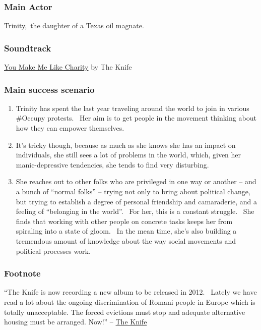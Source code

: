 \subsubsection{Main Actor}

Trinity,~the daughter of a Texas oil magnate.

\subsubsection{Soundtrack}

\href{http://www.youtube.com/watch?v=NWsX9ggfL2Q}{You Make Me Like
Charity} by The Knife

\subsubsection{Main success scenario}

\begin{enumerate}
\item
  Trinity has spent the last year traveling around the world to join in
  various \#Occupy protests. ~Her aim is to get people in the movement
  thinking about how they can empower themselves.
\item
  It's tricky though, because as much as she knows she has an impact on
  individuals, she still sees a lot of problems in the world, which,
  given her manic-depressive tendencies, she tends to find very
  disturbing.
\item
  She reaches out to other folks who are privileged in one way or
  another -- and a bunch of ``normal folks'' -- trying not only to bring
  about political change, but trying to establish a degree of personal
  friendship and camaraderie, and a feeling of ``belonging in the
  world''. ~For her, this is a constant struggle. ~She finds that
  working with other people on concrete tasks keeps her from spiraling
  into a state of gloom. ~In the mean time, she's also building a
  tremendous amount of knowledge about the way social movements and
  political processes work.
\end{enumerate}

\subsubsection{Footnote}

``The Knife is now recording a new album to be released in 2012. ~Lately
we have read a lot about the ongoing discrimination of Romani people in
Europe which is totally unacceptable. The forced evictions must stop and
adequate alternative housing must be arranged. Now!'' --
\href{http://theknife.net/take-action-for-the-housing-rights-of-roma-in-rome}{The
Knife}
